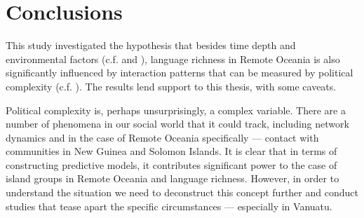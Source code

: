 \documentclass[unnumsec,webpdf,modern,medium]{oup-authoring-template}
\begin{document}
 

\FloatBarrier
\section{Conclusions}
This study investigated the hypothesis that besides time depth and environmental factors (c.f. \citet{curriemace2009, gavin2012island, hua2019ecological} and \citet{Pacheco_Coelho_2019}), language richness in Remote Oceania is also significantly influenced by interaction patterns that can be measured by political complexity (c.f. \citet{pawley81, pawley2007}). The results lend support to this thesis, with some caveats. 

Political complexity is, perhaps unsurprisingly, a complex variable. There are a number of phenomena in our social world that it could track, including network dynamics and in the case of Remote Oceania specifically --- contact with communities in New Guinea and Solomon Islands. It is clear that in terms of constructing predictive models, it contributes significant power to the case of island groups in Remote Oceania and language richness. However, in order to understand the situation we need to deconstruct this concept further and conduct studies that tease apart the specific circumstances --- especially in Vanuatu. 
\end{document}
